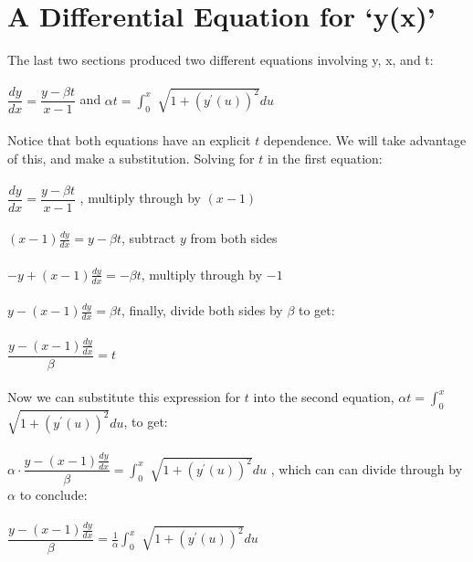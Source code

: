 \documentclass[12pt]{article}
\begin{document}
	\section{A Differential Equation for \textquoteleft y(x)\textquoteright}
	
	\indent \indent The last two sections produced two different equations involving y, x, and t:
	\\
	\\
	$\dfrac{dy}{dx} = \dfrac{y -\beta t}{x-1}$ \hspace{1cm} and \hspace{1cm} $\alpha t=${\Large $\int^x_0$} $ \sqrt{ 1 + (y^{\prime}(u))^{2}}du$
	\\
	\\
	\indent Notice that both equations have an explicit $t$ dependence. We will take advantage of this, and make a substitution. Solving for $t$ in the first equation: 
	\\
	\\
	$\dfrac{dy}{dx} = \dfrac{y -\beta t}{x-1}$ \hspace{2.66cm}, multiply through by $(x-1)$
	\\
	\\
	$(x-1)\frac{dy}{dx} = y -\beta t$\hspace{1.75cm}, subtract $y$ from both sides
	\\
	\\
	$-y + (x-1)\frac{dy}{dx} =-\beta t$\hspace{1.1cm}, multiply through by $-1$
	\\
	\\
	$y - (x-1)\frac{dy}{dx} =\beta t$\hspace{1.75cm}, finally, divide both sides by $\beta$ to get:
	\\
	\\
	$\dfrac{y - (x-1)\frac{dy}{dx}}{\beta}=t$
	\\
	\\
	Now we can substitute this expression for $t$ into the second equation, $\alpha t=${\Large $\int^x_0$} $ \sqrt{ 1 + (y^{\prime}(u))^{2}}du$, to get:
	\\
	\\
	$\alpha \cdot \dfrac{y - (x-1)\frac{dy}{dx}}{\beta}=${\Large $\int^x_0$} $ \sqrt{ 1 + (y^{\prime}(u))^{2}}du$ \hspace{1cm}, which can can divide through by $\alpha$ to conclude:
	\\
	\\
	$\dfrac{y - (x-1)\frac{dy}{dx}}{\beta}=\frac{1}{\alpha}${\Large $\int^x_0$} $ \sqrt{ 1 + (y^{\prime}(u))^{2}}du$
	\clearpage
	
\end{document}
